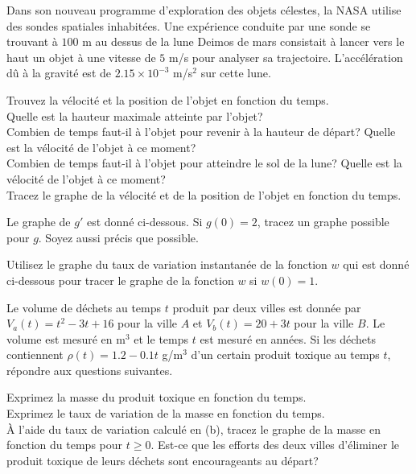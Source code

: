 \begin{question}
Dans son nouveau programme d'exploration des objets célestes, la NASA
utilise des sondes spatiales inhabitées.  Une expérience conduite par
une sonde se trouvant à $100$ m au dessus de la lune Deimos de mars
consistait à lancer vers le haut un objet à une vitesse de $5$ m/s
pour analyser sa trajectoire. L'accélération dû à la gravité est de
$2.15\times 10^{-3}$ m/s$^2$ sur cette lune.

 Trouvez la vélocité et la position de l'objet en fonction du
temps.\\
 Quelle est la hauteur maximale atteinte par l'objet?\\
 Combien de temps faut-il à l'objet pour revenir à la hauteur
de départ?  Quelle est la vélocité de l'objet à ce moment?\\
 Combien de temps faut-il à l'objet pour atteindre le sol de
la lune? Quelle est la vélocité de l'objet à ce moment?\\
 Tracez le graphe de la vélocité et de la position de l'objet
en fonction du temps.
\label{6Q9}
\end{question}

\begin{question}
Le graphe de $g'$ est donné ci-dessous.
Si $g(0)= 2$, tracez un graphe possible pour $g$.  Soyez aussi précis que
possible.
\label{6Q10}
\end{question}

\begin{question}
Utilisez le graphe du taux de variation instantanée de la fonction $w$
qui est donné ci-dessous pour tracer le graphe de la fonction $w$ si $w(0)=1$.
\label{6Q11}
\end{question}

\begin{question}[\life]
Le volume de déchets au temps $t$ produit par deux villes est donnée
par $\displaystyle V_a(t) = t^2 - 3t + 16$ pour la ville $A$ et
$V_b(t) = 20 + 3t$ pour la ville $B$.  Le volume est mesuré en m$^3$
et le temps $t$ est mesuré en années.  Si les déchets contiennent
$\rho(t) = 1.2 - 0.1 t$ g/m$^3$ d'un certain produit toxique au temps
$t$, répondre aux questions suivantes.

 Exprimez la masse du produit toxique en fonction du temps.\\
 Exprimez le taux de variation de la masse en fonction du temps.\\
 À l'aide du taux de variation calculé en (b), tracez le
graphe de la masse en fonction du temps pour $t\geq 0$.  Est-ce que
les efforts des deux villes d'éliminer le produit toxique de leurs
déchets sont encourageants au départ?
\label{6Q12}
\end{question}

